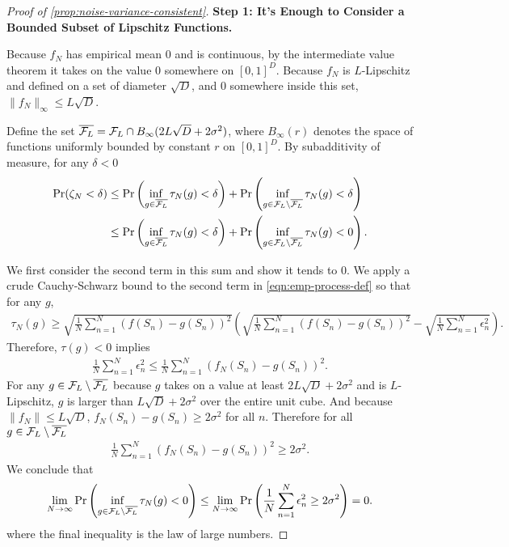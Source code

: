 \begin{proof}[Proof of \cref{prop:noise-variance-consistent}]
 \textbf{Step 1: It's Enough to Consider a Bounded Subset of Lipschitz Functions.}

Because $f_N$ has empirical mean $0$ and is continuous, by the intermediate value theorem it takes on the value $0$ somewhere on $[0,1]^D$. Because $f_N$ is $L$-Lipschitz and defined on a set of diameter $\sqrt{D}$, and $0$ somewhere inside this set, $\|f_N\|_{\infty} \leq L\sqrt{D}$.

Define the set $\overline{\mathcal{F}_L} = \mathcal{F}_L \cap B_{\infty}(2L\sqrt{D}+ 2 \sigma^2)$, where $B_{\infty}(r)$ denotes the space of functions uniformly bounded by constant $r$ on $[0,1]^D$.  By subadditivity of measure, for any $\delta < 0$
\begin{align}
    \mathrm{Pr}(\zeta_N < \delta) &\leq \mathrm{Pr}\left(\inf_{g \in \overline{\mathcal{F}_L}} \tau_N(g) < \delta\right) +  \mathrm{Pr}\left(\inf_{g \in \mathcal{F}_L\setminus \overline{\mathcal{F}_L}} \tau_N(g) < \delta\right) \\
    & \leq \mathrm{Pr}\left(\inf_{g \in \overline{\mathcal{F}_L}} \tau_N(g) < \delta\right) +  \mathrm{Pr}\left(\inf_{g \in \mathcal{F}_L\setminus \overline{\mathcal{F}_L}} \tau_N(g) < 0\right).
\end{align}

We first consider the second term in this sum and show it tends to $0$. We apply a crude Cauchy-Schwarz bound to the second term in \cref{eqn:emp-process-def} so that for any $g$, 
\begin{align}
    \tau_N(g) \geq \sqrt{\frac{1}{N}\sum_{n=1}^N (f(S_n) - g(S_n))^2}\left(\sqrt{\frac{1}{N}\sum_{n=1}^N (f(S_n) - g(S_n))^2} - \sqrt{\frac{1}{N}\sum_{n=1}^N\epsilon_n^2}\right).
\end{align}
Therefore, $\tau(g) < 0$ implies
\begin{align}
    \frac{1}{N}\sum_{n=1}^N\epsilon_n^2 \leq \frac{1}{N}\sum_{n=1}^N (f_N(S_n) - g(S_n))^2.
\end{align}
For any $g \in \mathcal{F}_L\setminus \overline{\mathcal{F}_L}$ because $g$ takes on a value at least $2L\sqrt{D}+ 2 \sigma^2$ and is $L$-Lipschitz, $g$ is larger than $L\sqrt{D}+ 2 \sigma^2$ over the entire unit cube. And because $\|f_N\| \leq L \sqrt{D}$, $f_N(S_n) - g(S_n) \geq 2 \sigma^2$ for all $n$. Therefore for all $g \in \mathcal{F}_L\setminus \overline{\mathcal{F}_L}$ 
\begin{align}
    \frac{1}{N}\sum_{n=1}^N (f_N(S_n) - g(S_n))^2 \geq 2\sigma^2.
\end{align}
We conclude that 
\begin{align}
    \lim_{N \to \infty} \mathrm{Pr}\left(\inf_{g \in \mathcal{F}_L\setminus \overline{\mathcal{F}_L}} \tau_N(g) < 0\right) \leq \lim_{N \to \infty} \mathrm{Pr}\left(\frac{1}{N}\sum_{n=1}^N\epsilon_n^2 \geq 2 \sigma^2\right) = 0.
\end{align}
where the final inequality is the law of large numbers.


\end{proof}
